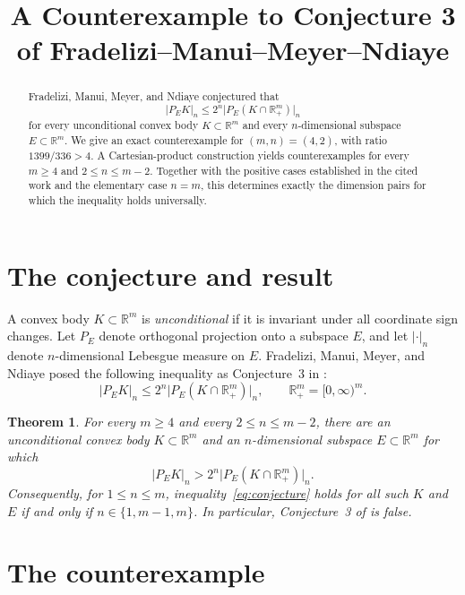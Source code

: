 \documentclass[11pt]{amsart}
\title[A counterexample to Conjecture 3]
{A Counterexample to Conjecture 3 of Fradelizi--Manui--Meyer--Ndiaye}
\date{}
\newtheorem{theorem}{Theorem}
\theoremstyle{remark}
\newcommand{\R}{\mathbb{R}}
\begin{document}
\begin{abstract}
Fradelizi, Manui, Meyer, and Ndiaye conjectured that
\[
  |P_EK|_n\le 2^n\bigl|P_E(K\cap\R_+^m)\bigr|_n
\]
for every unconditional convex body $K\subset\R^m$ and every $n$-dimensional
subspace $E\subset\R^m$. We give an exact counterexample for $(m,n)=(4,2)$,
with ratio $1399/336>4$. A Cartesian-product construction yields
counterexamples for every $m\ge4$ and $2\le n\le m-2$. Together with the
positive cases established in the cited work and the elementary case $n=m$,
this determines exactly the dimension pairs for which the inequality holds
universally.
\end{abstract}

\maketitle

\section{The conjecture and result}

A convex body $K\subset\R^m$ is \emph{unconditional} if it is invariant under
all coordinate sign changes. Let $P_E$ denote orthogonal projection onto a
subspace $E$, and let $|\cdot|_n$ denote $n$-dimensional Lebesgue measure on
$E$. Fradelizi, Manui, Meyer, and Ndiaye posed the following inequality as
Conjecture~3 in \cite{FMMN}:
\begin{equation}\label{eq:conjecture}
  |P_EK|_n\le 2^n\bigl|P_E(K\cap\R_+^m)\bigr|_n,
  \qquad \R_+^m=[0,\infty)^m.
\end{equation}

\begin{theorem}\label{thm:main}
For every $m\ge4$ and every $2\le n\le m-2$, there are an unconditional convex
body $K\subset\R^m$ and an $n$-dimensional subspace $E\subset\R^m$ for which
\[
  |P_EK|_n>2^n\bigl|P_E(K\cap\R_+^m)\bigr|_n.
\]
Consequently, for $1\le n\le m$, inequality~\eqref{eq:conjecture} holds for
all such $K$ and $E$ if and only if $n\in\{1,m-1,m\}$. In particular,
Conjecture~3 of \cite{FMMN} is false.
\end{theorem}

\section{The counterexample}
\end{document}
